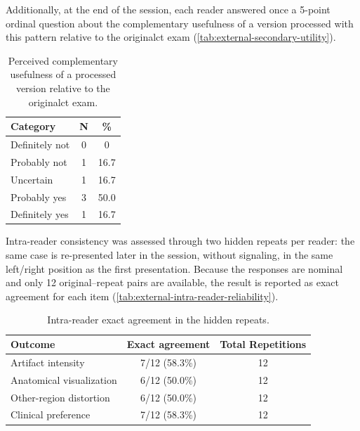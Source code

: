 Additionally, at the end of the session, each reader answered once a 5-point ordinal question about the complementary usefulness of a version processed with this pattern relative to the original\acrshort{ct} exam (\autoref{tab:external-secondary-utility}).

\begin{table}[htbp]
\centering
\small
\begin{tabular}{lcc}
\toprule
\textbf{Category} & \textbf{N} & \textbf{\%} \\
\midrule
Definitely not & 0 & 0 \\
Probably not & 1 & 16.7 \\
Uncertain & 1 & 16.7 \\
Probably yes & 3 & 50.0 \\
Definitely yes & 1 & 16.7 \\
\bottomrule
\end{tabular}
\captionsetup{skip=2pt}
\caption[Secondary outcome: complementary utility]{Perceived complementary usefulness of a processed version relative to the original\acrshort{ct} exam.}
\label{tab:external-secondary-utility}
\end{table}
\FloatBarrier

Intra-reader consistency was assessed through two hidden repeats per reader: the same case is re-presented later in the session, without signaling, in the same left/right position as the first presentation. Because the responses are nominal and only 12 original--repeat pairs are available, the result is reported as exact agreement for each item (\autoref{tab:external-intra-reader-reliability}).

\begin{table}[htbp]
\centering
\small
\begin{tabular}{lcc}
\toprule
\textbf{Outcome} & \textbf{Exact agreement} & \textbf{Total Repetitions} \\
\midrule
Artifact intensity & 7/12 (58.3\%) & 12 \\
Anatomical visualization & 6/12 (50.0\%) & 12 \\
Other-region distortion & 6/12 (50.0\%) & 12 \\
Clinical preference & 7/12 (58.3\%) & 12 \\
\bottomrule
\end{tabular}
\captionsetup{skip=2pt}
\caption[Intra-reader repeat agreement]{Intra-reader exact agreement in the hidden repeats.}
\label{tab:external-intra-reader-reliability}
\end{table}
\FloatBarrier

